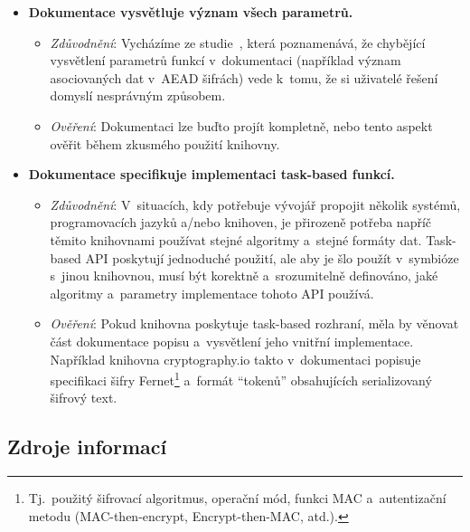 \begin{itemize}
    \item \textbf{Dokumentace vysvětluje význam všech parametrů.}
    \begin{itemize}[beginpenalty=10000]
        \item \textit{Zdůvodnění}: Vycházíme ze studie~\cite{rustcryptoapis}, která poznamenává, že chybějící vysvětlení parametrů funkcí v~dokumentaci (například význam asociovaných dat v~AEAD šifrách) vede k~tomu, že si uživatelé řešení domyslí nesprávným způsobem.

        \item \textit{Ověření}: Dokumentaci lze buďto projít kompletně, nebo tento aspekt ověřit během zkus\-mé\-ho použití knihovny.
    \end{itemize}
    
    \item \textbf{Dokumentace specifikuje implementaci task-based funkcí.} 
    \begin{itemize}[beginpenalty=10000]
        \item \textit{Zdůvodnění}: V~situacích, kdy potřebuje vývojář propojit několik systémů, programovacích jazyků a/nebo knihoven, je přirozeně potřeba napříč těmito knihovnami používat stejné algoritmy a~stejné formáty dat. Task-based API poskytují jednoduché použití, ale aby je šlo použít v~symbióze s~jinou knihovnou, musí být korektně a~srozumitelně definováno, jaké algoritmy a~parametry implementace tohoto API používá.

        \item \textit{Ověření}: Pokud knihovna poskytuje task-based rozhraní, měla by věnovat část dokumentace popisu a~vysvětlení jeho vnitřní implementace. Například knihovna cryptography.io takto v~dokumentaci popisuje specifikaci šifry Fernet\footnote{Tj.~použitý šifrovací algoritmus, operační mód, funkci MAC a~autentizační metodu (MAC-then-encrypt, Encrypt-then-MAC, atd.).} a~formát ``tokenů'' obsahujících serializovaný šifrový text.
    \end{itemize}
\end{itemize}

\subsection{Zdroje informací}

